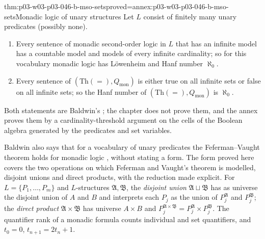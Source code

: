 \begin{hblemma}{thm:p03-w03-p03-046-b-mso-sets}{proved=annex:p03-w03-p03-046-b-mso-sets}{Monadic logic of unary structures}
Let \(L\) consist of finitely many unary predicates (possibly none).
\begin{enumerate}
  \item Every sentence of monadic second-order logic in \(L\) that has an
        infinite model has a countable model and models of every infinite
        cardinality; so for this vocabulary monadic logic has L\"owenheim
        and Hanf number \(\aleph_0\).
  \item Every sentence of \((\mathrm{Th}(=),Q_{\mathrm{mon}})\) is either
        true on all infinite sets or false on all infinite sets; so the
        Hanf number of \((\mathrm{Th}(=),Q_{\mathrm{mon}})\) is \(\aleph_0\).
\end{enumerate}
\end{hblemma}

Both statements are Baldwin's \cite[pp.~446, 449]{Baldwin1985DSOQ}; the
chapter does not prove them, and the annex proves them by a
cardinality-threshold argument on the cells of the Boolean algebra
generated by the predicates and set variables.

Baldwin also says that for a vocabulary of unary predicates the
Feferman--Vaught theorem holds for monadic logic
\cite[p.~446]{Baldwin1985DSOQ}, without stating a form. The form proved
here covers the two operations on which Feferman and Vaught's theorem is
modelled, disjoint unions and direct products, with the reduction made
explicit. For \(L=\{P_1,\dots,P_m\}\) and \(L\)-structures
\(\mathfrak A,\mathfrak B\), the \emph{disjoint union}
\(\mathfrak A\sqcup\mathfrak B\) has as universe the disjoint union of \(A\)
and \(B\) and interprets each \(P_j\) as the union of \(P_j^{\mathfrak A}\)
and \(P_j^{\mathfrak B}\); the \emph{direct product}
\(\mathfrak A\times\mathfrak B\) has universe \(A\times B\) and
\(P_j^{\mathfrak A\times\mathfrak B}=P_j^{\mathfrak A}\times
P_j^{\mathfrak B}\). The quantifier rank of a monadic formula counts
individual and set quantifiers, and \(t_0=0\), \(t_{n+1}=2t_n+1\).

